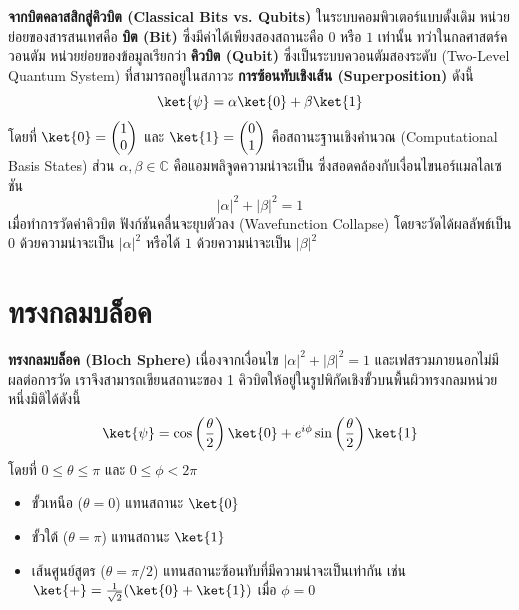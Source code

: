 \textbf{จากบิตคลาสสิกสู่คิวบิต (Classical Bits vs. Qubits)} ในระบบคอมพิวเตอร์แบบดั้งเดิม หน่วยย่อยของสารสนเทศคือ \textbf{บิต (Bit)} ซึ่งมีค่าได้เพียงสองสถานะคือ $0$ หรือ $1$ เท่านั้น ทว่าในกลศาสตร์ควอนตัม หน่วยย่อยของข้อมูลเรียกว่า \textbf{คิวบิต (Qubit)} ซึ่งเป็นระบบควอนตัมสองระดับ (Two-Level Quantum System) ที่สามารถอยู่ในสภาวะ \textbf{การซ้อนทับเชิงเส้น (Superposition)} ดังนี้
\begin{equation}
\ket{\psi} = \alpha \ket{0} + \beta \ket{1}
\end{equation}
โดยที่ $\ket{0} = \begin{pmatrix} 1 \\ 0 \end{pmatrix}$ และ $\ket{1} = \begin{pmatrix} 0 \\ 1 \end{pmatrix}$ คือสถานะฐานเชิงคำนวณ (Computational Basis States) ส่วน $\alpha, \beta \in \mathbb{C}$ คือแอมพลิจูดความน่าจะเป็น ซึ่งสอดคล้องกับเงื่อนไขนอร์แมลไลเซชัน
\begin{equation}
|\alpha|^2 + |\beta|^2 = 1
\end{equation}
เมื่อทำการวัดค่าคิวบิต ฟังก์ชันคลื่นจะยุบตัวลง (Wavefunction Collapse) โดยจะวัดได้ผลลัพธ์เป็น $0$ ด้วยความน่าจะเป็น $|\alpha|^2$ หรือได้ $1$ ด้วยความน่าจะเป็น $|\beta|^2$

\section{ทรงกลมบล็อค}

\textbf{ทรงกลมบล็อค (Bloch Sphere)} เนื่องจากเงื่อนไข $|\alpha|^2 + |\beta|^2 = 1$ และเฟสรวมภายนอกไม่มีผลต่อการวัด เราจึงสามารถเขียนสถานะของ 1 คิวบิตให้อยู่ในรูปพิกัดเชิงขั้วบนพื้นผิวทรงกลมหน่วยหนึ่งมิติได้ดังนี้
\begin{equation}
\ket{\psi} = \cos\left(\frac{\theta}{2}\right) \ket{0} + e^{i\phi} \sin\left(\frac{\theta}{2}\right) \ket{1}
\end{equation}
โดยที่ $0 \le \theta \le \pi$ และ $0 \le \phi < 2\pi$
\begin{itemize}
    \item ขั้วเหนือ ($\theta = 0$) แทนสถานะ $\ket{0}$
    \item ขั้วใต้ ($\theta = \pi$) แทนสถานะ $\ket{1}$
    \item เส้นศูนย์สูตร ($\theta = \pi/2$) แทนสถานะซ้อนทับที่มีความน่าจะเป็นเท่ากัน เช่น $\ket{+} = \frac{1}{\sqrt{2}}(\ket{0} + \ket{1})$ เมื่อ $\phi = 0$
\end{itemize}

